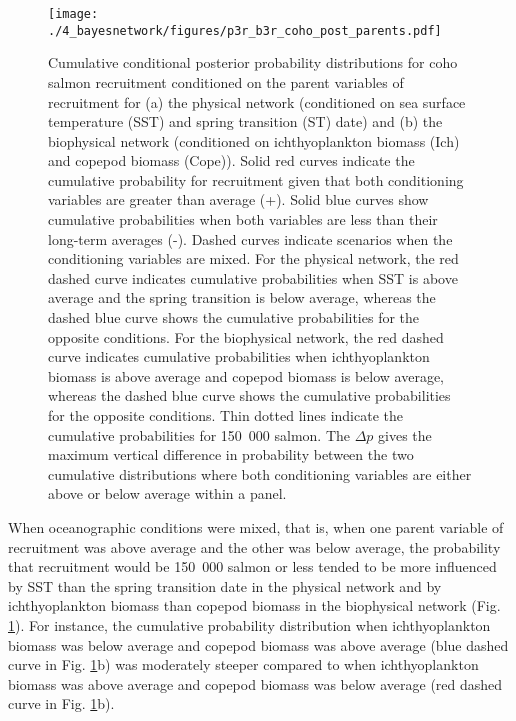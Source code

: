 \begin{figure}[htbp]
  \centering \texttt{[image: ./4\_bayesnetwork/figures/p3r\_b3r\_coho\_post\_parents.pdf]}
  \caption[Cumulative conditional posterior probability distributions for coho
           salmon recruitment conditioned on the parent variables of
           recruitment]{Cumulative conditional posterior probability
           distributions for coho salmon recruitment conditioned on the parent
           variables of recruitment for (a) the physical network (conditioned on
           sea surface temperature (SST) and spring transition (ST) date) and
           (b) the biophysical network (conditioned on ichthyoplankton biomass
           (Ich) and copepod biomass (Cope)). Solid red curves indicate
           the cumulative probability for recruitment given that both
           conditioning variables are greater than average (+). Solid
           blue curves show cumulative probabilities when both variables are
           less than their long-term averages (-). Dashed curves indicate
           scenarios when the conditioning variables are mixed. For the physical
           network, the red dashed curve indicates cumulative probabilities
           when SST is above average and the spring transition is below average,
           whereas the dashed blue curve shows the cumulative probabilities for
           the opposite conditions. For the biophysical network, the red dashed
           curve indicates cumulative probabilities when ichthyoplankton biomass
           is above average and copepod biomass is below average, whereas the
           dashed blue curve shows the cumulative probabilities for the
           opposite conditions. Thin dotted lines indicate the cumulative
           probabilities for 150~000 salmon.  The \(\Delta p\) gives the maximum
           vertical difference in probability between the two cumulative
           distributions where both conditioning variables are either above or
           below average within a panel.}
  \label{fig:bn:8}
\end{figure}

When oceanographic conditions were mixed, that is, when one parent variable of
recruitment was above average and the other was below average, the probability
that recruitment would be 150~000 salmon or less tended to be more influenced by
SST than the spring transition date in the physical network and by
ichthyoplankton biomass than copepod biomass in the biophysical network (Fig.
\ref{fig:bn:8}). For instance, the cumulative probability distribution when
ichthyoplankton biomass was below average and copepod biomass was above average
(blue dashed curve in Fig. \ref{fig:bn:8}b) was moderately steeper compared to
when ichthyoplankton biomass was above average and copepod biomass was below
average (red dashed curve in Fig. \ref{fig:bn:8}b).


